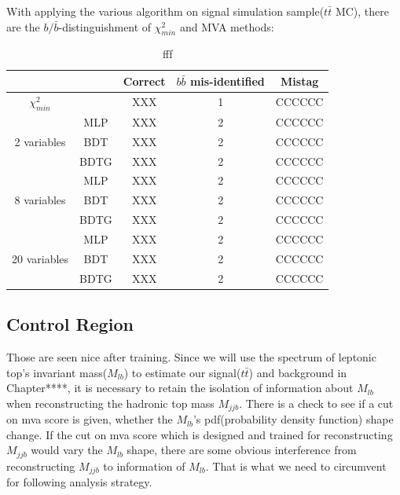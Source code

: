 		With applying the various algorithm on signal simulation sample($t\bar{t}$ MC), there are the $b/\bar{b}$-distinguishment of $\chi^2_{min}$ and MVA methods:

		\begin{center}
		\begin{longtable}[H]{ c c c c c }			%
		\caption{fff}\\
		\hline
		[\%] & & Correct & $b\bar{b}$ mis-identified & Mistag  \\ 
		\hline
		$\chi^2_{min}$ &  & XXX & 1 & CCCCCC \\
		\hline
		\multirow{3}{5em}{2 variables} & MLP & XXX & 2 & CCCCCC \\
		& BDT & XXX & 2 & CCCCCC \\
		& BDTG & XXX & 2 & CCCCCC \\
		\hline
		\multirow{3}{5em}{8 variables} & MLP & XXX & 2 & CCCCCC \\
		& BDT & XXX & 2 & CCCCCC \\
		& BDTG & XXX & 2 & CCCCCC \\
		\hline
		\multirow{3}{5em}{20 variables} & MLP & XXX & 2 & CCCCCC \\
		& BDT & XXX & 2 & CCCCCC \\
		& BDTG & XXX & 2 & CCCCCC \\
		\hline  
		\end{longtable}
		\end{center}



	\subsection{Control Region}
	\label{ssec:CR}


		Those are seen nice after training. Since we will use the spectrum of leptonic top's invariant mass($M_{lb}$) to estimate our signal($t\bar{t}$) and background in Chapter****, it is necessary to retain the isolation of information about $M_{lb}$ when reconstructing the hadronic top mass $M_{jjb}$. There is a check to see if a cut on mva score is given, whether the $M_{lb}$'s pdf(probability density function) shape change. If the cut on mva score which is designed and trained for reconstructing $M_{jjb}$ would vary the $M_{lb}$ shape, there are some obvious interference from reconstructing $M_{jjb}$ to information of $M_{lb}$. That is what we need to circumvent for following analysis strategy.

		\begin{figure}[H]
		\end{figure}
		\FloatBarrier


\FloatBarrier
